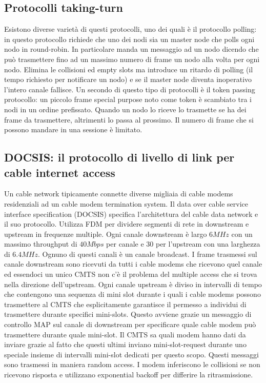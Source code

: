 \subsection{Protocolli taking-turn}
Esistono diverse variet\`a di questi protocolli, uno dei quali \`e il protocollo polling: in questo protocollo richiede che uno dei nodi sia un master node che polls ogni nodo in round-robin. In particolare manda un 
messaggio ad un nodo dicendo che pu\`o trasmettere fino ad un massimo numero di frame un nodo alla volta per ogni nodo. Elimina le collisioni ed empty slots ma introduce un ritardo di polling (il tempo
richiesto per notificare un nodo) e se il master node diventa inoperativo l'intero canale fallisce. Un secondo di questo tipo di protocolli \`e il token passing protocollo: un piccolo frame special purpose noto come
token \`e scambiato tra i nodi in un ordine prefissato. Quando un nodo lo riceve lo trasmette se ha dei frame da trasmettere, altrimenti lo passa al prossimo. Il numero di frame che si possono mandare in una 
sessione \`e limitato. 
\subsection{DOCSIS: il protocollo di livello di link per cable internet access}
Un cable network tipicamente connette diverse migliaia di cable modems residenziali ad un cable modem termination system. Il data over cable service interface specification (DOCSIS) specifica l'architettura
del cable data network e il suo protocollo. Utilizza FDM per dividere segmenti di rete  in downstream e upstream in frequenze multiple. Ogni canale downstream \`e largo $6MHz$ con un massimo throughput 
di $40Mbps$ per canale e $30$ per l'upstream con una larghezza di $6.4MHz$.  Ognuno di questi canali \`e un canale broadcast.  I frame trasmessi sul canale downstream sono ricevuti da tutti i cable modems
che ricevono quel canale ed essendoci un unico CMTS non c'\`e il problema del multiple access che si trova nella direzione dell'upstream. Ogni canale upstream \`e diviso in intervalli di tempo che contengono 
una sequenza di mini slot durante i quali i cable modems possono trasmettere al CMTS che esplicitamente garantisce il permesso a individui di trasmettere durante specifici mini-slots. Questo avviene grazie un 
messaggio di controllo MAP sul canale di downstream per specificare quale cable modem pu\`o trasmettere durante quale mini-slot. Il CMTS sa quali modem hanno dati da inviare grazie al fatto che questi 
ultimi inviano mini-slot-request durante uno speciale insieme di intervalli mini-slot dedicati per questo scopo. Questi messaggi sono trasmessi in maniera random access. I modem inferiscono le collisioni se 
non ricevono risposta e utilizzano exponential backoff per differire la ritrasmissione. 
